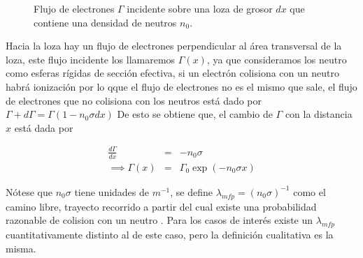 \documentclass[11pt]{article}
\theoremstyle{definition}
\begin{document}
    \begin{figure}[hbt!]
 		\label{fig:slabdx}
 		\centering
 		\caption{Flujo de electrones $\Gamma$ incidente sobre una loza de grosor $dx$ que contiene una densidad de neutros $n_0$.}
 	\end{figure}

    Hacia la loza hay un flujo de electrones perpendicular al \'area transversal de la loza, este flujo incidente los llamaremos $\Gamma(x)$, ya que consideramos los neutro como esferas r\'igidas de secci\'on efectiva, si un electr\'on colisiona con un neutro habr\'a ionizaci\'on por lo qque el flujo de electrones no es el mismo que sale, el flujo de electrones que no colisiona con los neutros est\'a dado por $\Gamma + d\Gamma = \Gamma(1 - n_0\sigma dx)$ De esto se obtiene que, el cambio de $\Gamma$ con la distancia $x$ est\'a dada por 

    \begin{eqnarray}
      \frac{d\Gamma}{dx} &=& -n_0\sigma \nonumber\\
      \implies \Gamma(x) &=& \Gamma_0\exp{(-n_0\sigma x)} \nonumber
    \end{eqnarray}
  
    N\'otese que $n_0\sigma$ tiene unidades de $m^{-1}$, se define $\lambda_{mfp} = (n_0\sigma)^{-1}$ como el camino libre, trayecto recorrido a partir del cual existe una probabilidad razonable de colision con un neutro \cite{goldston1995}. Para los casos de inter\'es existe un $\lambda_{mfp}$ cuantitativamente distinto al de este caso, pero la definici\'on cualitativa es la misma.
\end{document}
